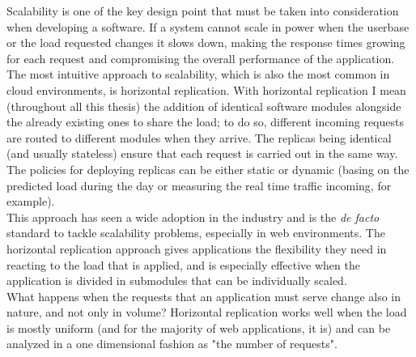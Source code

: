 Scalability is one of the key design point that must be taken into consideration when developing a software. If a system cannot scale in power when the userbase or the load requested changes it slows down, making the response times growing for each request and compromising the overall performance of the application. The most intuitive approach to scalability, which is also the most common in cloud environments, is horizontal replication. With horizontal replication I mean (throughout all this thesis) the addition of identical software modules alongside the already existing ones to share the load; to do so, different incoming requests are routed to different modules when they arrive. The replicas being identical (and usually stateless) ensure that each request is carried out in the same way. The policies for deploying replicas can be either static or dynamic (basing on the predicted load during the day or measuring the real time traffic incoming, for example).\\

This approach has seen a wide adoption in the industry and is the \textit{de facto} standard to tackle scalability problems, especially in web environments. The horizontal replication approach gives applications the flexibility they need in reacting to the load that is applied, and is especially effective when the application is divided in submodules that can be individually scaled.\\

What happens when the requests that an application must serve change also in nature, and not only in volume? Horizontal replication works well when the load is mostly uniform (and for the majority of web applications, it is) and can be analyzed in a one dimensional fashion as "the number of requests". %
